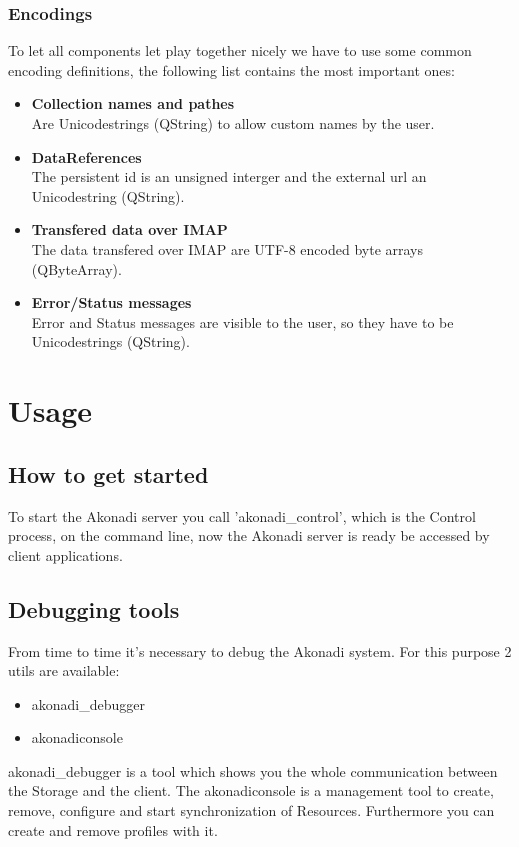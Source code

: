 \documentclass[]{report}
\begin{document}
\subsection{Encodings}
To let all components let play together nicely we have to use some common encoding
definitions, the following list contains the most important ones:
\begin{itemize}
  \item \textbf{Collection names and pathes}\\
        Are Unicodestrings (QString) to allow custom names by the user.
  \item \textbf{DataReferences}\\
        The persistent id is an unsigned interger and the external url
        an Unicodestring (QString).
  \item \textbf{Transfered data over IMAP}\\
        The data transfered over IMAP are UTF-8 encoded byte arrays (QByteArray).
  \item \textbf{Error/Status messages}\\
        Error and Status messages are visible to the user, so they have to be
        Unicodestrings (QString).
\end{itemize}

\chapter{Usage}

\section{How to get started}
To start the Akonadi server you call 'akonadi\_control', which is the Control process,
on the command line, now the Akonadi server is ready be accessed by client applications.

\section{Debugging tools}
From time to time it's necessary to debug the Akonadi system. For this purpose 2 utils are
available:
\begin{itemize}
  \item akonadi\_debugger
  \item akonadiconsole
\end{itemize}

akonadi\_debugger is a tool which shows you the whole communication between the Storage and
the client.
The akonadiconsole is a management tool to create, remove, configure and start synchronization
of Resources. Furthermore you can create and remove profiles with it.
\end{document}
